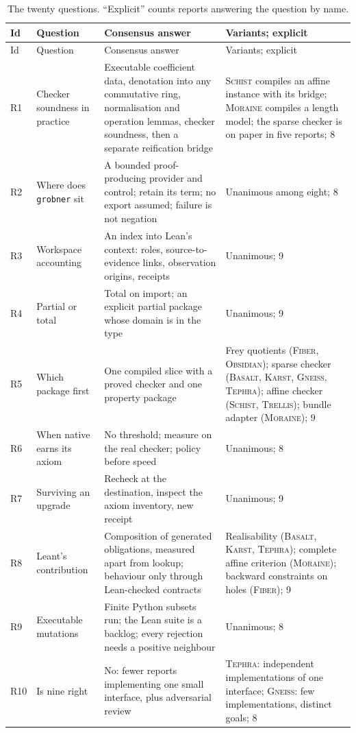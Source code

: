 \documentclass[11pt,a4paper]{article}
\newcommand{\code}[1]{\nolinkurl{#1}}
\newcommand{\Bs}{\textsc{Basalt}}
\newcommand{\Fb}{\textsc{Fiber}}
\newcommand{\Gn}{\textsc{Gneiss}}
\newcommand{\Ks}{\textsc{Karst}}
\newcommand{\Mr}{\textsc{Moraine}}
\newcommand{\Ob}{\textsc{Obsidian}}
\newcommand{\Sc}{\textsc{Schist}}
\newcommand{\Tp}{\textsc{Tephra}}
\newcommand{\Tr}{\textsc{Trellis}}
\theoremstyle{definition}
\begin{document}
{\small
\begin{longtable}{@{}L{8mm}L{36mm}L{58mm}L{45mm}@{}}
\caption{The twenty questions. ``Explicit'' counts reports answering the question by name.}\label{tab:questions}\\
\toprule
Id & Question & Consensus answer & Variants; explicit\\
\midrule\endfirsthead
\toprule
Id & Question & Consensus answer & Variants; explicit\\
\midrule\endhead
\bottomrule\endfoot
R1 & Checker soundness in practice & Executable coefficient data, denotation into any commutative ring, normalisation and operation lemmas, checker soundness, then a separate reification bridge & \Sc{} compiles an affine instance with its bridge; \Mr{} compiles a length model; the sparse checker is on paper in five reports; 8\\
R2 & Where does \code{grobner} sit & A bounded proof-producing provider and control; retain its term; no export assumed; failure is not negation & Unanimous among eight; 8\\
R3 & Workspace accounting & An index into Lean's context: roles, source-to-evidence links, observation origins, receipts & Unanimous; 9\\
R4 & Partial or total & Total on import; an explicit partial package whose domain is in the type & Unanimous; 9\\
R5 & Which package first & One compiled slice with a proved checker and one property package & Frey quotients (\Fb, \Ob); sparse checker (\Bs, \Ks, \Gn, \Tp); affine checker (\Sc, \Tr); bundle adapter (\Mr); 9\\
R6 & When native earns its axiom & No threshold; measure on the real checker; policy before speed & Unanimous; 8\\
R7 & Surviving an upgrade & Recheck at the destination, inspect the axiom inventory, new receipt & Unanimous; 9\\
R8 & Leant's contribution & Composition of generated obligations, measured apart from lookup; behaviour only through Lean-checked contracts & Realisability (\Bs, \Ks, \Tp); complete affine criterion (\Mr); backward constraints on holes (\Fb); 9\\
R9 & Executable mutations & Finite Python subsets run; the Lean suite is a backlog; every rejection needs a positive neighbour & Unanimous; 8\\
R10 & Is nine right & No: fewer reports implementing one small interface, plus adversarial review & \Tp: independent implementations of one interface; \Gn: few implementations, distinct goals; 8\\

\end{longtable}}
\end{document}
